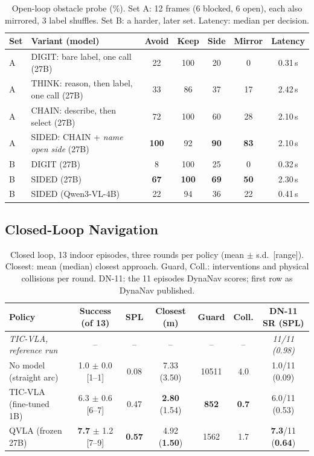 \documentclass[runningheads]{llncs}
\begin{document}
\begin{table}[t]
\caption{Open-loop obstacle probe (\%). Set A: 12 frames (6 blocked, 6 open), each also
mirrored, 3 label shuffles. Set B: a harder, later set. Latency: median per decision.}
\label{tab:probe}
\centering
\begin{tabular}{llccccc}
\hline
Set & Variant (model) & Avoid & Keep & Side & Mirror & Latency \\
\hline
A & DIGIT: bare label, one call (27B)             & 22  & 100 & 20 & 0  & 0.31\,s \\
A & THINK: reason, then label, one call (27B)     & 33  & 86  & 37 & 17 & 2.42\,s \\
A & CHAIN: describe, then select (27B)            & 72  & 100 & 60 & 28 & 2.10\,s \\
A & SIDED: CHAIN + \emph{name open side} (27B)    & \textbf{100} & 92 & \textbf{90} & \textbf{83} & 2.10\,s \\
\hline
B & DIGIT (27B)                                   & 8   & 100 & 25 & 0  & 0.32\,s \\
B & SIDED (27B)                                   & \textbf{67} & \textbf{100} & \textbf{69} & \textbf{50} & 2.30\,s \\
B & SIDED (Qwen3-VL-4B)                           & 22  & 94  & 36 & 22 & 0.41\,s \\
\hline
\end{tabular}
\end{table}

\subsection{Closed-Loop Navigation}
\label{sec:closed}

\begin{table}[t]
\caption{Closed loop, 13 indoor episodes, three rounds per policy (mean $\pm$ s.d.\
[range]). Closest: mean (median) closest approach. Guard, Coll.: interventions and physical
collisions per round. DN-11: the 11 episodes DynaNav scores; first row as DynaNav published.}
\label{tab:closed}
\centering
\begin{tabular}{lcccccc}
\hline
Policy & Success (of 13) & SPL & Closest (m) & Guard & Coll. & DN-11 SR (SPL) \\
\hline
\emph{TIC-VLA, reference run} & -- & -- & -- & -- & -- & \emph{11/11 (0.98)} \\
No model (straight arc) & 1.0 $\pm$ 0.0 [1--1] & 0.08 & 7.33 (3.50) & 10511 & 4.0 & 1.0/11 (0.09) \\
TIC-VLA (fine-tuned 1B) & 6.3 $\pm$ 0.6 [6--7] & 0.47 & \textbf{2.80} (1.54) & \textbf{852} & \textbf{0.7} & 6.0/11 (0.53) \\
QVLA (frozen 27B)       & \textbf{7.7} $\pm$ 1.2 [7--9] & \textbf{0.57} & 4.92 (\textbf{1.50}) & 1562 & 1.7 & \textbf{7.3}/11 (\textbf{0.64}) \\
\hline
\end{tabular}
\end{table}
\end{document}
